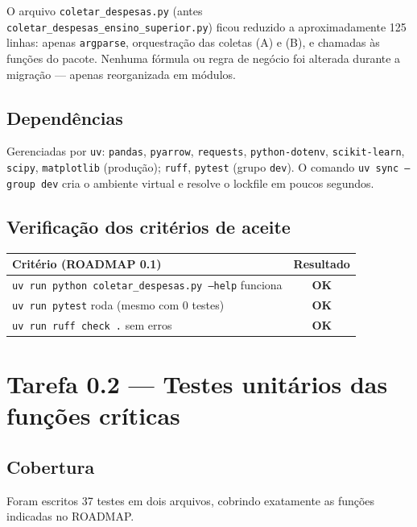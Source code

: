 \documentclass[11pt,a4paper]{article}
\newcommand{\aceite}{\textcolor{green!45!black}{\textbf{OK}}}
\begin{document}
O arquivo \texttt{coletar\_despesas.py} (antes
\texttt{coletar\_despesas\_ensino\_superior.py}) ficou reduzido a
aproximadamente 125 linhas: apenas \texttt{argparse}, orquestração das
coletas (A) e (B), e chamadas às funções do pacote. Nenhuma fórmula ou regra
de negócio foi alterada durante a migração --- apenas reorganizada em
módulos.

\subsection{Dependências}

Gerenciadas por \texttt{uv}: \texttt{pandas}, \texttt{pyarrow},
\texttt{requests}, \texttt{python-dotenv}, \texttt{scikit-learn},
\texttt{scipy}, \texttt{matplotlib} (produção); \texttt{ruff},
\texttt{pytest} (grupo \texttt{dev}). O comando \texttt{uv sync --group dev}
cria o ambiente virtual e resolve o lockfile em poucos segundos.

\subsection{Verificação dos critérios de aceite}

\begin{table}[h]
\centering
\begin{tabular}{@{}p{9.5cm}c@{}}
\toprule
\textbf{Critério (ROADMAP 0.1)} & \textbf{Resultado} \\
\midrule
\texttt{uv run python coletar\_despesas.py --help} funciona & \aceite \\
\texttt{uv run pytest} roda (mesmo com 0 testes) & \aceite \\
\texttt{uv run ruff check .} sem erros & \aceite \\
\bottomrule
\end{tabular}
\end{table}

\section{Tarefa 0.2 --- Testes unitários das funções críticas}

\subsection{Cobertura}

Foram escritos 37 testes em dois arquivos, cobrindo exatamente as funções
indicadas no ROADMAP.
\end{document}
